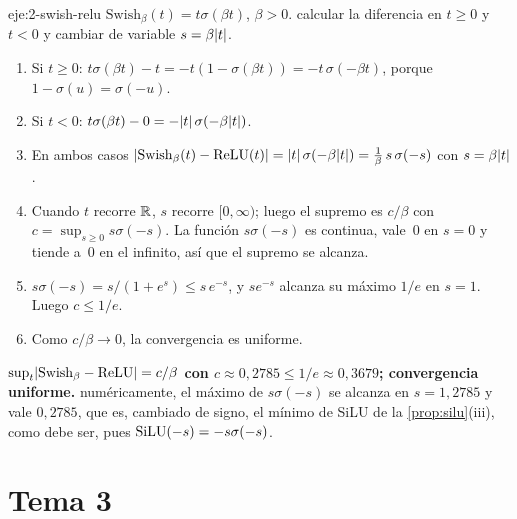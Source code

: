 \begin{solucion}{eje:2-swish-relu}
\datos $\mathrm{Swish}_\beta(t)=t\sigma(\beta t)$, $\beta>0$.
\planteamiento calcular la diferencia en $t\ge 0$ y $t<0$ y cambiar de variable $s=\beta\lvert t\rvert$.
\pasos
\begin{enumerate}[label=\arabic*.]
  \item Si $t\ge 0$: $t\sigma(\beta t)-t=-t(1-\sigma(\beta t))=-t\,\sigma(-\beta t)$, porque $1-\sigma(u)=\sigma(-u)$.
  \item Si $t<0$: $t\sigma(\beta t)-0=-\lvert t\rvert\,\sigma(-\beta\lvert t\rvert)$.
  \item En ambos casos $\lvert\mathrm{Swish}_\beta(t)-\operatorname{ReLU}(t)\rvert=\lvert t\rvert\,\sigma(-\beta\lvert t\rvert)=\frac1\beta\,s\,\sigma(-s)$ con $s=\beta\lvert t\rvert$.
  \item Cuando $t$ recorre $\mathbb{R}$, $s$ recorre $[0,\infty)$; luego el supremo es $c/\beta$ con $c=\sup_{s\ge0}s\sigma(-s)$. La función $s\sigma(-s)$ es continua, vale~0 en $s=0$ y tiende a~0 en el infinito, así que el supremo se alcanza.
  \item $s\sigma(-s)=s/(1+e^{s})\le s\,e^{-s}$, y $s e^{-s}$ alcanza su máximo $1/e$ en $s=1$. Luego $c\le 1/e$.
  \item Como $c/\beta\to 0$, la convergencia es uniforme.
\end{enumerate}
\resultado \textbf{$\sup_t\lvert\mathrm{Swish}_\beta-\operatorname{ReLU}\rvert=c/\beta$ con $c\approx 0{,}2785\le 1/e\approx 0{,}3679$; convergencia uniforme.}
\comprobacion numéricamente, el máximo de $s\sigma(-s)$ se alcanza en $s=1{,}2785$ y vale $0{,}2785$, que es, cambiado de signo, el mínimo de SiLU de la \cref{prop:silu}(iii), como debe ser, pues $\operatorname{SiLU}(-s)=-s\sigma(-s)$.
\end{solucion}

\section{Tema 3}

